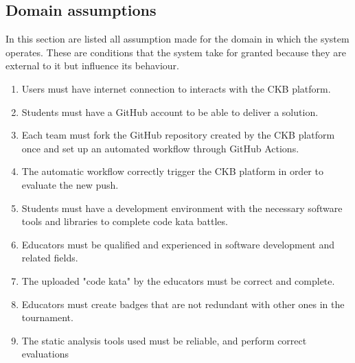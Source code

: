 \subsection{Domain assumptions}
In this section are listed all assumption made for the domain in which the system operates. These are conditions that the system take for granted because they are external to it but influence its behaviour.
\begin{enumerate}[label=\textbf{DA.\arabic*}]
        \item {} {Users must have internet connection to interacts with the CKB platform.}
        \item {} {Students must have a GitHub account to be able to deliver a solution.}
        \item {} {Each team must fork the GitHub repository created by the CKB platform once and set up an automated workflow through GitHub Actions.}
        \item {} {The automatic workflow correctly trigger the CKB platform in order to evaluate the new push.}
        \item {} {Students must have a development environment with the necessary software tools and libraries to complete code kata battles.}
        \item {} {Educators must be qualified and experienced in software development and related fields.}
        \item {} {The uploaded "code kata" by the educators must be correct and complete.}
        \item {} {Educators must create badges that are not redundant with other ones in the tournament.}
        \item {} {The static analysis tools used must be reliable, and perform correct evaluations}
\end{enumerate}